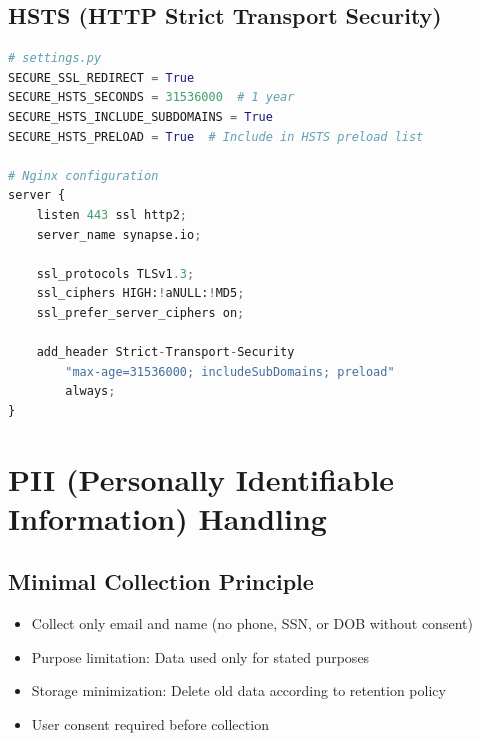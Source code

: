 \documentclass{report}
\begin{document}
\subsection{HSTS (HTTP Strict Transport Security)}
\begin{lstlisting}[language=Python]
# settings.py
SECURE_SSL_REDIRECT = True
SECURE_HSTS_SECONDS = 31536000  # 1 year
SECURE_HSTS_INCLUDE_SUBDOMAINS = True
SECURE_HSTS_PRELOAD = True  # Include in HSTS preload list

# Nginx configuration
server {
    listen 443 ssl http2;
    server_name synapse.io;
    
    ssl_protocols TLSv1.3;
    ssl_ciphers HIGH:!aNULL:!MD5;
    ssl_prefer_server_ciphers on;
    
    add_header Strict-Transport-Security 
        "max-age=31536000; includeSubDomains; preload" 
        always;
}
\end{lstlisting}

\section{PII (Personally Identifiable Information) Handling}

\subsection{Minimal Collection Principle}
\begin{itemize}
\item Collect only email and name (no phone, SSN, or DOB without consent)
\item Purpose limitation: Data used only for stated purposes
\item Storage minimization: Delete old data according to retention policy
\item User consent required before collection
\end{itemize}
\end{document}
